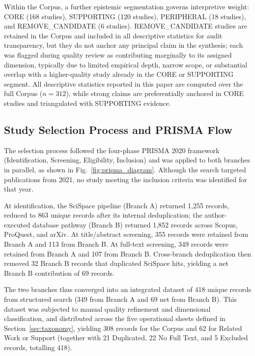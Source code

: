 Within the Corpus, a further epistemic segmentation governs interpretive weight: CORE (168 studies), SUPPORTING (120 studies), PERIPHERAL (18 studies), and REMOVE\_CANDIDATE (6 studies). REMOVE\_CANDIDATE studies are retained in the Corpus and included in all descriptive statistics for audit transparency, but they do not anchor any principal claim in the synthesis; each was flagged during quality review as contributing marginally to its assigned dimension, typically due to limited empirical depth, narrow scope, or substantial overlap with a higher-quality study already in the CORE or SUPPORTING segment. All descriptive statistics reported in this paper are computed over the full Corpus ($n = 312$), while strong claims are preferentially anchored in CORE studies and triangulated with SUPPORTING evidence.

\subsection{Study Selection Process and PRISMA Flow}
\label{sec:prisma-flow}
The selection process followed the four-phase PRISMA 2020 framework (Identification, Screening, Eligibility, Inclusion) and was applied to both branches in parallel, as shown in Fig.~\ref{fig:prisma_diagram}. Although the search targeted publications from 2021, no study meeting the inclusion criteria was identified for that year.

At identification, the SciSpace pipeline (Branch A) returned 1,255 records, reduced to 863 unique records after its internal deduplication; the author-executed database pathway (Branch B) returned 1,852 records across Scopus, ProQuest, and arXiv. At title/abstract screening, 355 records were retained from Branch A and 113 from Branch B. At full-text screening, 349 records were retained from Branch A and 107 from Branch B. Cross-branch deduplication then removed 32 Branch B records that duplicated SciSpace hits, yielding a net Branch B contribution of 69 records.

The two branches thus converged into an integrated dataset of 418 unique records from structured search (349 from Branch A and 69 net from Branch B). This dataset was subjected to manual quality refinement and dimensional classification, and distributed across the five operational sheets defined in Section~\ref{sec:taxonomy}, yielding 308 records for the Corpus and 62 for Related Work or Support (together with 21 Duplicated, 22 No Full Text, and 5 Excluded records, totalling 418).


